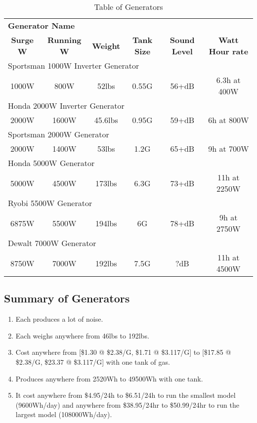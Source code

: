 \documentclass[
10pt, %
letterpaper, %
oneside, %
headinclude,footinclude, %
BCOR5mm, %
]{scrartcl}
\begin{document}
\begin{table}[hbt]
\caption{Table of Generators}
\centering
\begin{tabular}{cccccc}
\toprule

\multicolumn{4}{l}{\textbf{Generator Name}} \\
\textbf{Surge W} & \textbf{Running W} & \textbf{Weight} & \textbf{Tank Size} & \textbf{Sound Level} & \textbf{Watt Hour rate} \\

\midrule
\multicolumn{4}{l}{Sportsman 1000W Inverter Generator} \\
1000W & 800W & 52lbs & 0.55G & 56+dB & 6.3h at 400W \\

\midrule
\multicolumn{4}{l}{Honda 2000W Inverter Generator} \\
2000W & 1600W & 45.6lbs & 0.95G & 59+dB & 6h at 800W \\

\midrule
\multicolumn{4}{l}{Sportsman 2000W Generator} \\
2000W & 1400W & 53lbs & 1.2G & 65+dB & 9h at 700W \\

\midrule
\multicolumn{4}{l}{Honda 5000W Generator} \\
5000W & 4500W & 173lbs & 6.3G & 73+dB & 11h at 2250W \\

\midrule
\multicolumn{4}{l}{Ryobi 5500W Generator} \\
6875W & 5500W & 194lbs & 6G & 78+dB & 9h at 2750W \\

\midrule
\multicolumn{4}{l}{Dewalt 7000W Generator} \\
8750W & 7000W & 192lbs & 7.5G & ?dB & 11h at 4500W \\

\bottomrule
\end{tabular}
\label{tab:generators}
\end{table}

\subsection{Summary of Generators}
\begin{enumerate}[noitemsep]
\item Each produces a lot of noise.
\item Each weighs anywhere from 46lbs to 192lbs.
\item Cost anywhere from [\$1.30 @ \$2.38/G, \$1.71 @ \$3.117/G] to [\$17.85 @ \$2.38/G, \$23.37 @ \$3.117/G] with one tank of gas.
\item Produces anywhere from 2520Wh to 49500Wh with one tank.
\item It cost anywhere from \$4.95/24h to \$6.51/24h to run the smallest model (9600Wh/day) and anywhere from \$38.95/24hr to \$50.99/24hr to run the largest model (108000Wh/day).
\end{enumerate}
\end{document}
